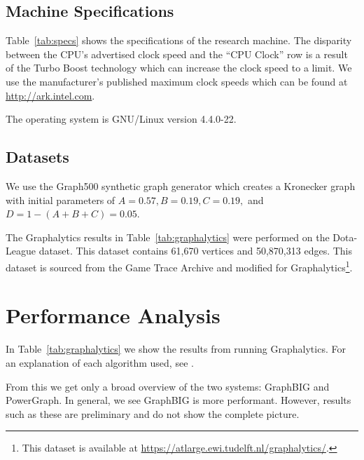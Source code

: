 \documentclass[conference]{IEEEtran}
\begin{document}
\subsection{Machine Specifications}
Table~\ref{tab:specs} shows the specifications of the research machine. The disparity between the CPU's advertised clock speed and the ``CPU Clock'' row is a result of the Turbo Boost technology which can increase the clock speed to a limit. We use the manufacturer's published maximum clock speeds which can be found at \url{http://ark.intel.com}.

\begin{table}
	\centering
	\caption{The operating system is GNU/Linux version 4.4.0-22.}
	\label{tab:specs}
\end{table}

\subsection{Datasets}
We use the Graph500 synthetic graph generator which creates a Kronecker graph \cite{Leskovec:2010:Kronecker} with initial parameters of $A = 0.57, B = 0.19, C = 0.19,$ and $D = 1-(A+B+C) = 0.05$.

The Graphalytics results in Table~\ref{tab:graphalytics} were performed on the Dota-League dataset. This dataset contains 61,670 vertices and 50,870,313 edges. This dataset is sourced from the Game Trace Archive\cite{Guo:2012:GTA} and modified for Graphalytics\footnote{This dataset is available at \url{https://atlarge.ewi.tudelft.nl/graphalytics/}.}.

\section{Performance Analysis}


In Table~\ref{tab:graphalytics} we show the results from running Graphalytics. For an explanation of each algorithm used, see \cite{Iosup:2016:Graphalyticstech}.

From this we get only a broad overview of the two systems: GraphBIG and PowerGraph. In general, we see GraphBIG is more performant. However, results such as these are preliminary and do not show the complete picture.
\end{document}
